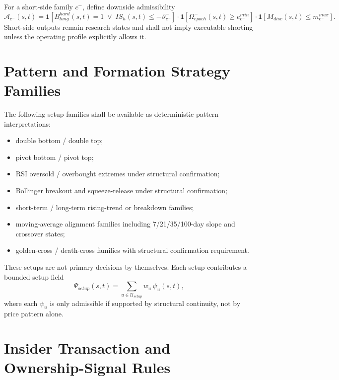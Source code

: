 For a short-side family $c^{-}$, define downside admissibility
\[
\mathcal{A}_{c^{-}}(s,t)=\mathbf{1}[B^{hard}_{long}(s,t)=1 \;\vee\; IS_h(s,t)\le -\vartheta_{c^{-}}^{-}]\cdot \mathbf{1}[\Omega_{epoch}^{-}(s,t)\ge e_{c^{-}}^{min}]\cdot \mathbf{1}[M_{disc}(s,t)\le m_{c^{-}}^{max}].
\]
Short-side outputs remain research states and shall not imply executable shorting unless the operating profile explicitly allows it.

\section{Pattern and Formation Strategy Families}

The following setup families shall be available as deterministic pattern interpretations:
\begin{itemize}
    \item double bottom / double top;
    \item pivot bottom / pivot top;
    \item RSI oversold / overbought extremes under structural confirmation;
    \item Bollinger breakout and squeeze-release under structural confirmation;
    \item short-term / long-term rising-trend or breakdown families;
    \item moving-average alignment families including 7/21/35/100-day slope and crossover states;
    \item golden-cross / death-cross families with structural confirmation requirement.
\end{itemize}

These setups are not primary decisions by themselves. Each setup contributes a bounded setup field
\[
\Psi_{setup}(s,t)=\sum_{u\in\mathcal{U}_{setup}} w_u\,\psi_u(s,t),
\]
where each $\psi_u$ is only admissible if supported by structural continuity, not by price pattern alone.

\section{Insider Transaction and Ownership-Signal Rules}

